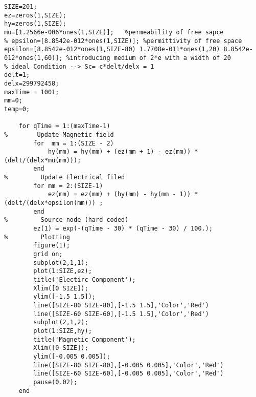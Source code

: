 \begin{lstlisting}
SIZE=201;
ez=zeros(1,SIZE);
hy=zeros(1,SIZE);
mu=[1.2566e-006*ones(1,SIZE)];   %permeability of free sapce
% epsilon=[8.8542e-012*ones(1,SIZE)]; %permittivity of free space 
epsilon=[8.8542e-012*ones(1,SIZE-80) 1.7708e-011*ones(1,20) 8.8542e-012*ones(1,60)]; %introducing medium of 2*e with a width of 20
% ideal Condition --> Sc= c*delt/delx = 1
delt=1;
delx=299792458;
maxTime = 1001;
mm=0;
temp=0;

    for qTime = 1:(maxTime-1)
%        Update Magnetic field
        for  mm = 1:(SIZE - 2)
            hy(mm) = hy(mm) + (ez(mm + 1) - ez(mm)) * (delt/(delx*mu(mm)));
        end
%         Update Electrical filed
        for mm = 2:(SIZE-1)
            ez(mm) = ez(mm) + (hy(mm) - hy(mm - 1)) * (delt/(delx*epsilon(mm))) ;
        end
%         Source node (hard coded)
        ez(1) = exp(-(qTime - 30) * (qTime - 30) / 100.);
%         Plotting
        figure(1);
        grid on; 
        subplot(2,1,1);
        plot(1:SIZE,ez);
        title('Electirc Component');
        Xlim([0 SIZE]);
        ylim([-1.5 1.5]);
        line([SIZE-80 SIZE-80],[-1.5 1.5],'Color','Red')
        line([SIZE-60 SIZE-60],[-1.5 1.5],'Color','Red')
        subplot(2,1,2);
        plot(1:SIZE,hy);
        title('Magnetic Component');
        Xlim([0 SIZE]);
        ylim([-0.005 0.005]);
        line([SIZE-80 SIZE-80],[-0.005 0.005],'Color','Red')
        line([SIZE-60 SIZE-60],[-0.005 0.005],'Color','Red')
        pause(0.02);
    end
\end{lstlisting}

